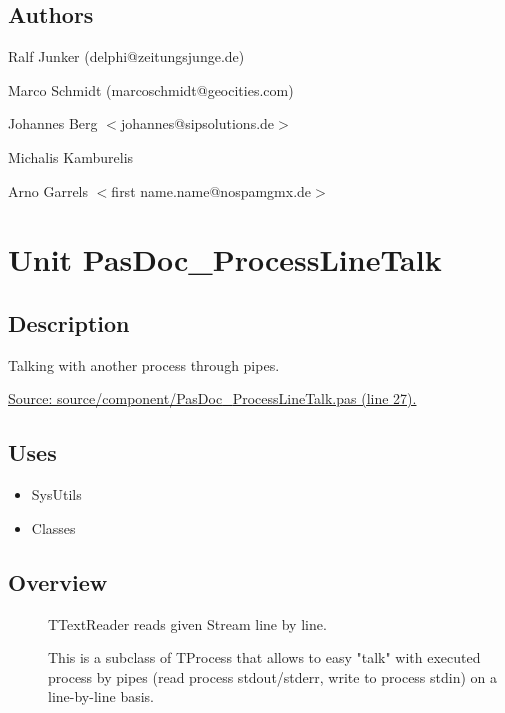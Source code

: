 \documentclass{report}
\begin{document}
\section{Authors}
\par
Ralf Junker (delphi@zeitungsjunge.de)

\par
Marco Schmidt (marcoschmidt@geocities.com)

\par
Johannes Berg {$<$}johannes@sipsolutions.de{$>$}

\par
Michalis Kamburelis

\par
Arno Garrels {$<$}first name.name@nospamgmx.de{$>$}

\chapter{Unit PasDoc{\_}ProcessLineTalk}
\label{PasDoc_ProcessLineTalk}
\section{Description}
Talking with another process through pipes.\hfill\vspace*{1ex}

  \par
\href{https://github.com/pasdoc/pasdoc/blob/master/source/component/PasDoc_ProcessLineTalk.pas#L27}{Source: source/component/PasDoc{\_}ProcessLineTalk.pas (line 27).}
\section{Uses}
\begin{itemize}
\item \begin{ttfamily}SysUtils\end{ttfamily}\item \begin{ttfamily}Classes\end{ttfamily}\end{itemize}
\section{Overview}
\begin{description}
\item[\texttt{\begin{ttfamily}TTextReader\end{ttfamily} Class}]TTextReader reads given Stream line by line.
\item[\texttt{\begin{ttfamily}TProcessLineTalk\end{ttfamily} Class}]This is a subclass of TProcess that allows to easy "talk" with executed process by pipes (read process stdout/stderr, write to process stdin) on a line{-}by{-}line basis.
\end{description}
\end{document}
